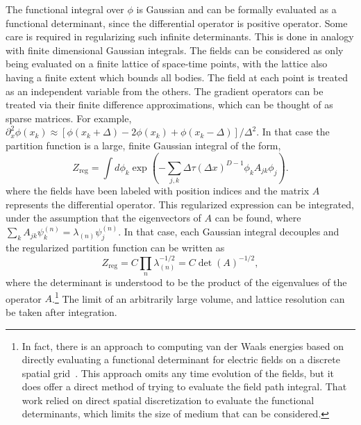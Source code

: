 The functional integral over $\phi$ is Gaussian and can be formally evaluated as a 
functional determinant, since the differential operator is positive operator.  
Some care is required in regularizing such infinite determinants.
This is done in analogy with finite dimensional Gaussian integrals.  
The fields can be considered as only being evaluated on a finite lattice of space-time points,
with the lattice also having a finite extent which bounds all bodies.  
The field at each point is treated as an independent variable from the others.   
The gradient operators can be treated via their finite difference approximations, 
which can be thought of as sparse matrices.
For example, $\partial_x^2\phi(x_k) \approx [\phi(x_k+\Delta)-2\phi(x_k)+\phi(x_k-\Delta)]/\Delta^2$.
In that case the partition function is a large, finite Gaussian integral of the form, 
\begin{equation}
  Z_{\text{reg}} = \int d\phi_k\exp\left(-\sum_{j,k}\Delta \tau (\Delta x)^{D-1}\phi_k A_{jk}\phi_j\right).
\end{equation}
where the fields have been labeled with position indices and the matrix $A$ represents the differential
operator.  
This regularized expression can be integrated, under the assumption that the eigenvectors of $A$ can be found,
where $\sum_kA_{jk}\psi^{(n)}_k=\lambda_{(n)}\psi^{(n)}_j$.  In that case, each Gaussian integral decouples and the 
regularized partition function can be written as 
\begin{equation}
   Z_{\text{reg}} = C \prod_n \lambda_{(n)}^{-1/2} = C \det(A)^{-1/2},
\end{equation}
where the determinant is understood to be the product of the eigenvalues of the operator $A$.\footnote{
In fact, there is an approach to computing van der Waals energies based on directly 
evaluating a functional determinant for electric fields on a discrete spatial grid~\citep{Maggs2006,Pasquali2008}. This approach 
omits any time evolution of the fields, but it does offer a direct method of trying to evaluate the field path integral.
That work relied on direct spatial discretization to evaluate the functional determinants, which limits
the size of medium that can be considered.
}
The limit of an arbitrarily large volume, and lattice resolution can be taken after integration.


